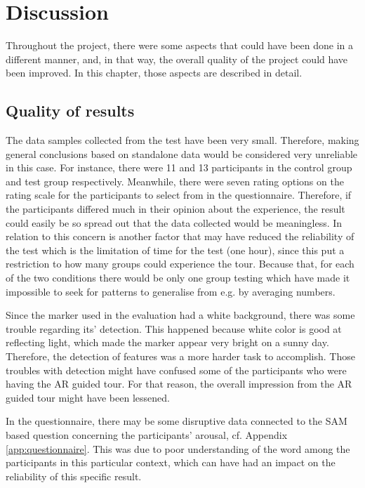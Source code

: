 \chapter{Discussion}\label{ch:discussion}
Throughout the project, there were some aspects that could have been done in a different manner, and, in that way, the overall quality of the project could have been improved. In this chapter, those aspects are described in detail.

\section{Quality of results}
The data samples collected from the test have been very small. Therefore, making general conclusions based on standalone data would be considered very unreliable in this case. For instance, there were 11 and 13 participants in the control group and test group respectively. Meanwhile, there were seven rating options on the rating scale for the participants to select from in the questionnaire. Therefore, if the participants differed much in their opinion about the experience, the result could easily be so spread out that the data collected would be meaningless. In relation to this concern is another factor that may have reduced the reliability of the test which is the limitation of time for the test (one hour), since this put a restriction to how many groups could experience the tour. Because that, for each of the two conditions there would be only one group testing which have made it impossible to seek for patterns to generalise from e.g. by averaging numbers.

Since the marker used in the evaluation had a white background, there was some trouble regarding its' detection. This happened because white color is good at reflecting light, which made the marker appear very bright on a sunny day. Therefore, the detection of features was a more harder task to accomplish. Those troubles
with detection might have confused some of the participants who were having the AR guided tour. For that reason, the overall impression from the AR guided tour might have been lessened. 

In the questionnaire, there may be some disruptive data connected to the SAM based question concerning the participants’ arousal, cf. Appendix \ref{app:questionnaire}. This was due to poor understanding of the word among the participants in this particular context, which can have had an impact on the reliability of this specific result.

